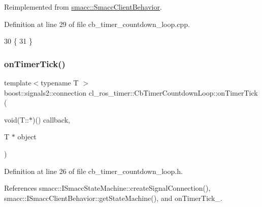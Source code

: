 Reimplemented from \hyperlink{classsmacc_1_1SmaccClientBehavior_a7e4fb6ce81ff96dc172425852d69c0c5}{smacc\+::\+Smacc\+Client\+Behavior}.



Definition at line 29 of file cb\+\_\+timer\+\_\+countdown\+\_\+loop.\+cpp.


\begin{DoxyCode}
30 \{
31 \}
\end{DoxyCode}
\mbox{\label{classcl__ros__timer_1_1CbTimerCountdownLoop_ad251cc8444ca7070f64658bbb77e1275}} 
\subsubsection{\texorpdfstring{on\+Timer\+Tick()}{onTimerTick()}}
{\footnotesize\ttfamily template$<$typename T $>$ \\
boost\+::signals2\+::connection cl\+\_\+ros\+\_\+timer\+::\+Cb\+Timer\+Countdown\+Loop\+::on\+Timer\+Tick (\begin{DoxyParamCaption}\item[{void(T\+::$\ast$)()}]{callback,  }\item[{T $\ast$}]{object }\end{DoxyParamCaption})\hspace{0.3cm}{\ttfamily [inline]}}



Definition at line 26 of file cb\+\_\+timer\+\_\+countdown\+\_\+loop.\+h.



References smacc\+::\+I\+Smacc\+State\+Machine\+::create\+Signal\+Connection(), smacc\+::\+I\+Smacc\+Client\+Behavior\+::get\+State\+Machine(), and on\+Timer\+Tick\+\_\+.


